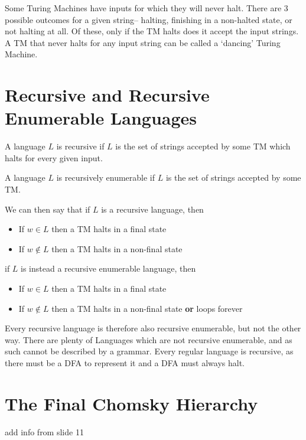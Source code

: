 
Some Turing Machines have inputs for which they will never halt. There are 3 possible outcomes for a given string--
 halting, finishing in a non-halted state, or not halting at all. Of these, only if the TM halts does it accept the
 input strings. A TM that never halts for any input string can be called a `dancing' Turing Machine.

\section*{Recursive and Recursive Enumerable Languages}

\begin{definition*}{}{}
  A language $L$ is recursive if $L$ is the set of strings accepted by some TM which halts for every given input.

  A language $L$ is recursively enumerable if $L$ is the set of strings accepted by some TM.
\end{definition*}

We can then say that if $L$ is a recursive language, then
\begin{itemize}
  \item If $w \in L$ then a TM halts in a final state
  \item If $w \notin L$ then a TM halts in a non-final state
\end{itemize}
if $L$ is instead a recursive enumerable language, then
\begin{itemize}
  \item If $w \in L$ then a TM halts in a final state
  \item If $w \notin L$ then a TM halts in a non-final state \textbf{or} loops forever
\end{itemize}

Every recursive language is therefore also recursive enumerable, but not the other way. There are plenty of Languages
 which are not recursive enumerable, and as such cannot be described by a grammar. Every regular language is recursive,
 as there must be a DFA to represent it and a DFA must always halt.

\section*{The Final Chomsky Hierarchy}

{\Huge add info from slide 11}

